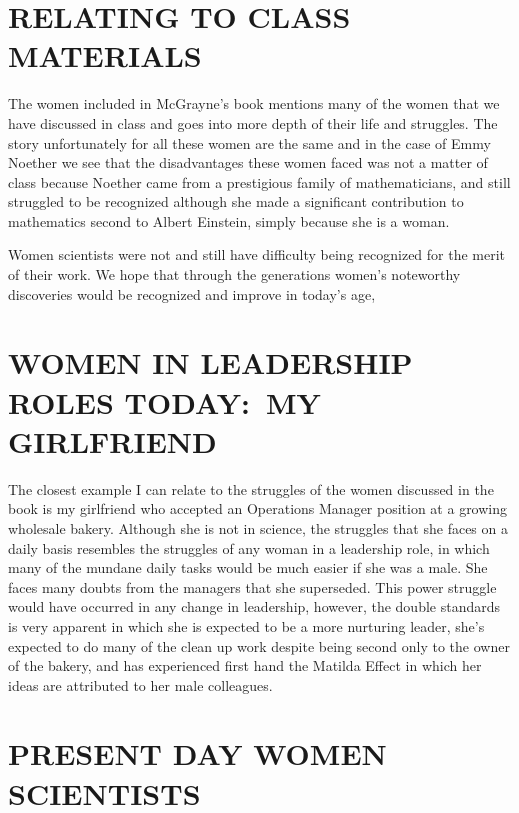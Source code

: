 \par
\section*{RELATING TO CLASS MATERIALS}

The women included in McGrayne’s book mentions many of the women that we have discussed in class and goes into more depth of their life and struggles. The story unfortunately for all these women are the same and in the case of Emmy Noether we see that the disadvantages these women faced was not a matter of class because Noether came from a prestigious family of mathematicians, and still struggled to be recognized although she made a significant contribution to mathematics second to Albert Einstein, simply because she is a woman. 

\par
Women scientists were not and still have difficulty being recognized for the merit of their work. We hope that through the generations women’s noteworthy discoveries would be recognized and improve in today’s age, 

\clearpage
\par
\section*{WOMEN IN LEADERSHIP ROLES TODAY:\ MY GIRLFRIEND}

The closest example I can relate to the struggles of the women discussed in the book is my girlfriend who accepted an Operations Manager position at a growing wholesale bakery. Although she is not in science, the struggles that she faces on a daily basis resembles the struggles of any woman in a leadership role, in which many of the mundane daily tasks would be much easier if she was a male. She faces many doubts from the managers that she superseded. This power struggle would have occurred in any change in leadership, however, the double standards is very apparent in which she is expected to be a more nurturing leader, she’s expected to do many of the clean up work despite being second only to the owner of the bakery, and has experienced first hand the Matilda Effect in which her ideas are attributed to her male colleagues. 

\par
\section*{PRESENT DAY WOMEN SCIENTISTS}

